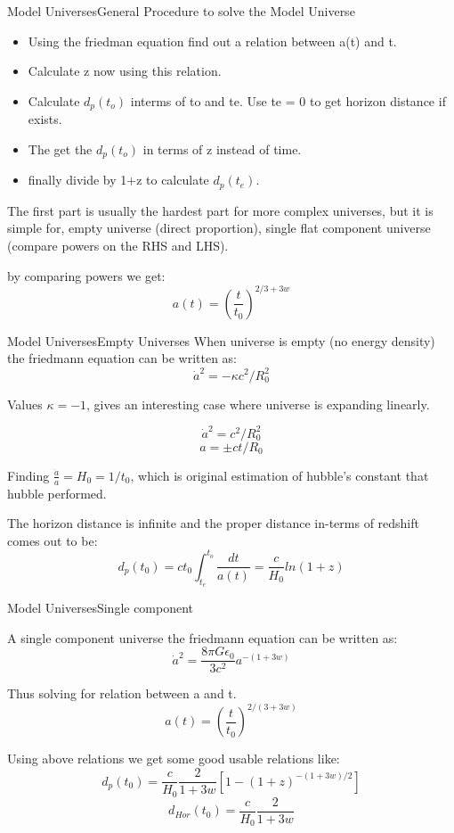 \begin{frame}{Model Universes}{General Procedure to solve the Model Universe}

\begin{itemize}[<+->]
	\item Using the friedman equation find out a relation between a(t) and
		t.
	\item Calculate z now using this relation.
	\item Calculate $d_p(t_o)$ interms of to and te. Use te = 0 to get
		horizon distance if exists.
	\item The get the $d_p(t_o)$ in terms of z instead of time.
	\item finally divide by 1+z to calculate $d_p(t_e)$.
\end{itemize}

The first part is usually the hardest part for more complex universes, but it
is simple for, empty universe (direct proportion), single flat component universe
(compare powers on the RHS and LHS).

by comparing powers we get:
$$ a(t) = \left(\frac{t}{t_0}\right)^{2/3+3w} $$

\end{frame}

\begin{frame}{Model Universes}{Empty Universes}
	When universe is empty (no energy density) the friedmann equation can be
	written as:
$$ \dot a^2 = - \kappa c^2 / R_0^2 $$

Values $\kappa = -1$, gives an interesting case where universe is expanding
linearly.

$$ \dot a^2 =  c^2 / R_0^2 $$
$$ a = \pm ct/R_0 $$

Finding $\frac{\dot a}{a} = H_0 = 1 / t_0$, which is original estimation of
hubble's constant that hubble performed.

The horizon distance is infinite and the proper distance in-terms of redshift comes out to be:
$$ d_p(t_0) = ct_0 \int^{t_o}_{t_e} \frac{dt}{a(t)} = \frac{c}{H_0} ln (1+z)$$

\end{frame}


\begin{frame}{Model Universes}{Single component}

A single component universe the friedmann equation can be written as:
$$ \dot a^2 = \frac{8\pi G\epsilon_0}{3c^2} a^{-(1+3w)} $$

Thus solving for relation between a and t.
$$ a(t) = \left( \frac{t}{t_0} \right)^{2/(3+3w)} $$

Using above relations we get some good usable relations like:
$$ d_p (t_0) = \frac{c}{H_0} \frac{2}{1+3w} [ 1 - (1+z)^{-(1+3w)/2} ] $$
$$ d_{Hor} (t_0) = \frac{c}{H_0} \frac{2}{1+3w} $$

\end{frame}


